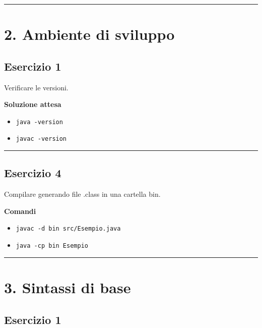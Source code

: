 \documentclass[
]{article}
\providecommand{\tightlist}{%
  \setlength{\itemsep}{0pt}\setlength{\parskip}{0pt}}
\begin{document}
\begin{center}\rule{0.5\linewidth}{0.5pt}\end{center}

\section{2. Ambiente di sviluppo}\label{ambiente-di-sviluppo}

\subsection{Esercizio 1}\label{esercizio-1-1}

Verificare le versioni.

\textbf{Soluzione attesa}

\begin{itemize}
\tightlist
\item
  \texttt{java\ -version}
\item
  \texttt{javac\ -version}
\end{itemize}

\begin{center}\rule{0.5\linewidth}{0.5pt}\end{center}

\subsection{Esercizio 4}\label{esercizio-4-1}

Compilare generando file .class in una cartella bin.

\textbf{Comandi}

\begin{itemize}
\tightlist
\item
  \texttt{javac\ -d\ bin\ src/Esempio.java}
\item
  \texttt{java\ -cp\ bin\ Esempio}
\end{itemize}

\begin{center}\rule{0.5\linewidth}{0.5pt}\end{center}

\section{3. Sintassi di base}\label{sintassi-di-base}

\subsection{Esercizio 1}\label{esercizio-1-2}
\end{document}
